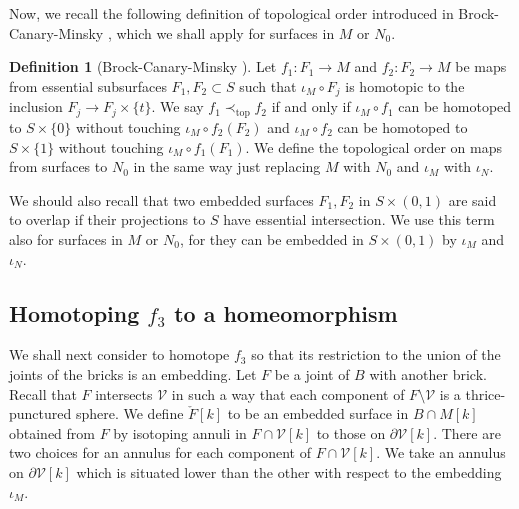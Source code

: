 \documentclass{amsart}
\newtheorem{lemma}[theorem]{Lemma}
\theoremstyle{definition}
\newtheorem{definition}[theorem]{Definition}
\numberwithin{figure}{section}
\numberwithin{equation}{section}
\def\cv{\mathcal{V}}
\begin{document}


Now, we recall the following definition of topological order introduced in Brock-Canary-Minsky \cite{bcm}, which we shall apply for  surfaces in $M$ or $N_0$.

\begin{definition}[Brock-Canary-Minsky \cite{bcm}]
\label{def:topological order}
Let $f_1: F_1 \rightarrow M$ and $f_2 : F_2 \rightarrow M$ be maps from essential subsurfaces $F_1, F_2 \subset S$ such that $\iota_M \circ F_j$ is homotopic to the inclusion $F_j \rightarrow F_j \times \{t\}$.
We say $f_1 \prec_\mathrm{top} f_2$ if and only if $\iota_M \circ f_1$ can be homotoped to $S \times \{0\}$ without touching $\iota_M \circ f_2(F_2)$ and $\iota_M \circ f_2$ can be homotoped to $S \times \{1\}$ without touching $\iota_M \circ f_1(F_1)$.
We define the topological order on maps from surfaces to $N_0$ in the same way just replacing $M$ with $N_0$ and $\iota_M$ with $\iota_N$.
\end{definition}

We should also recall that two embedded surfaces $F_1, F_2$ in $S\times (0,1)$ are said to overlap if their projections to $S$ have essential intersection.
We use this term also for surfaces in $M$ or $N_0$, for they can be embedded in $S\times (0,1)$ by $\iota_M$ and $\iota_N$.

\subsection{Homotoping $f_3$ to a homeomorphism}
\label{check defined}
We shall next consider to homotope $f_3$ so that its restriction to the union of the joints of the bricks is an embedding.
Let $F$ be a joint of $B$ with another brick.
Recall that $F$  intersects $\cv$ in such  a way that each component of $F \setminus \cv$ is a thrice-punctured sphere.
We define $\check F[k]$ to be an embedded surface in $B \cap M[k]$ obtained from $F$ by isotoping annuli in $F \cap \cv[k]$ to those on  $\partial \cv[k]$.
There are two choices for an annulus for each component of $F \cap \cv[k]$.
We take an annulus on $\partial \cv[k]$ which is situated lower than the other with respect to the embedding $\iota_M$.
\end{document}
